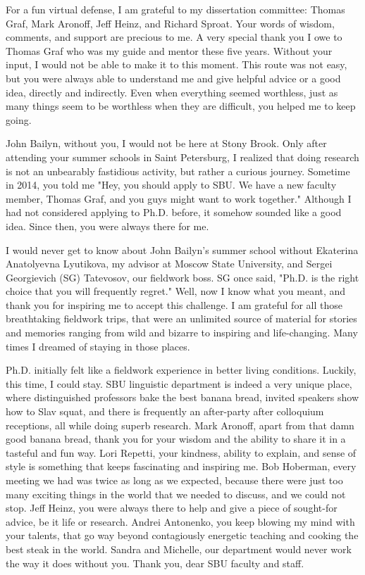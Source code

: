 {\small 
For a fun virtual defense, I am grateful to my dissertation committee: Thomas Graf, Mark Aronoff, Jeff Heinz, and Richard Sproat.
Your words of wisdom, comments, and support are precious to me.
A very special thank you I owe to Thomas Graf who was my guide and mentor these five years.
Without your input, I would not be able to make it to this moment.
This route was not easy, but you were always able to understand me and give helpful advice or a good idea, directly and indirectly.
Even when everything seemed worthless, just as many things seem to be worthless when they are difficult, you helped me to keep going.


John Bailyn, without you, I would not be here at Stony Brook.
Only after attending your summer schools in Saint Petersburg, I realized that doing research is not an unbearably fastidious activity, but rather a curious journey.
Sometime in 2014, you told me "Hey, you should apply to SBU.
We have a new faculty member, Thomas Graf, and you guys might want to work together."
Although I had not considered applying to Ph.D. before, it somehow sounded like a good idea.
Since then, you were always there for me.

I would never get to know about John Bailyn's summer school without Ekaterina Anatolyevna Lyutikova, my advisor at Moscow State University, and Sergei Georgievich (SG) Tatevosov, our fieldwork boss.
SG once said, "Ph.D. is the right choice that you will frequently regret."
Well, now I know what you meant, and thank you for inspiring me to accept this challenge.
I am grateful for all those breathtaking fieldwork trips, that were an unlimited source of material for stories and memories ranging from wild and bizarre to inspiring and life-changing.
Many times I dreamed of staying in those places.

Ph.D. initially felt like a fieldwork experience in better living conditions.
Luckily, this time, I could stay.
SBU linguistic department is indeed a very unique place, where distinguished professors bake the best banana bread, invited speakers show how to Slav squat, and there is frequently an after-party after colloquium receptions, all while doing superb research.
Mark Aronoff, apart from that damn good banana bread, thank you for your wisdom and the ability to share it in a tasteful and fun way.
Lori Repetti, your kindness, ability to explain, and sense of style is something that keeps fascinating and inspiring me.
Bob Hoberman, every meeting we had was twice as long as we expected, because there were just too many exciting things in the world that we needed to discuss, and we could not stop.
Jeff Heinz, you were always there to help and give a piece of sought-for advice, be it life or research.
Andrei Antonenko, you keep blowing my mind with your talents, that go way beyond contagiously energetic teaching and cooking the best steak in the world.
Sandra and Michelle, our department would never work the way it does without you.
Thank you, dear SBU faculty and staff.

}
